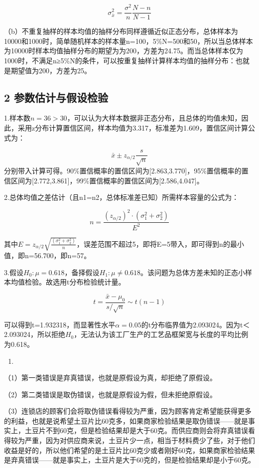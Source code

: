 \documentclass[]{ctexbook}
\begin{document}
\[\sigma_{\bar x}^2=\frac{\sigma^2}{n}\frac{N-n}{N-1}\]

（b）不重复抽样的样本均值的抽样分布同样遵循近似正态分布，总体样本为10000和1000时，简单随机样本的样本量n=100，5\%N=500和50，所以当总体样本为10000时样本均值抽样分布的期望为为200，方差为24.75。而当总体样本仅为1000时，不满足n≥5\%N的条件，可以按重复抽样计算样本均值的抽样分布：也就是期望值为200，方差为25。

\hypertarget{ux53c2ux6570ux4f30ux8ba1ux4e0eux5047ux8bbeux68c0ux9a8c-1}{%
\subsection{2 参数估计与假设检验}\label{ux53c2ux6570ux4f30ux8ba1ux4e0eux5047ux8bbeux68c0ux9a8c-1}}

1.样本数\(n=36>30\)，可以认为大样本数据非正态分布，且总体的均值未知，因此，采用z分布计算置信区间，样本均值为3.317，标准差为1.609，置信区间计算公式为：

\[\bar x\pm z_{\alpha/2}\frac{s}{\sqrt{n}}\]
分别带入计算可得。90\%置信概率的置信区间为{[}2.863,3.770{]}，95\%置信概率的置信区间为{[}2.772,3.861{]}，99\%置信概率的置信区间为{[}2.586,4.047{]}。

2.总体均值之差估计（且n1=n2，总体标准差已知）所需样本容量的公式为：

\[n=\frac{(z_{\alpha/2})^2\cdot(\sigma_1^2+\sigma_2^2)}{E^2}\]

其中\(E=z_{\alpha/2}\sqrt{\frac{(\sigma_1^2+\sigma_2^2)}{n}}\)，误差范围不超过5，即将E=5带入，即可得到n的最小值，即n=56.700，即n=57。

3.假设\(H_0: \mu=0.618\)，备择假设\(H_1: \mu≠0.618\)。该问题为总体方差未知的正态小样本均值检验。故选用t分布检验统计量。

\[t=\frac{\bar x-\mu_0}{s/\sqrt{n}}\sim t(n-1)\]

可以得到t=1.932318，而显著性水平\(\alpha=0.05\)的t分布临界值为2.093024。因为t＜2.093024，所以拒绝\(H_0\)，无法认为该工厂生产的工艺品框架宽与长度的平均比例为0.618。

\begin{enumerate}
\def\labelenumi{\arabic{enumi}.}
\setcounter{enumi}{3}
\item
\end{enumerate}

（1）第一类错误是弃真错误，也就是原假设为真，却拒绝了原假设。

（2）第二类错误是取伪错误，也就是原假设为假，但未拒绝原假设。

（3）连锁店的顾客们会将取伪错误看得较为严重，因为顾客肯定希望能获得更多的利益，也就是说希望土豆片比60克多，如果商家检验结果是取伪错误------就是事实上，土豆片不到60克，但是检验结果却是大于60克。而供应商则会将弃真错误看得较为严重，因为对供应商来说，土豆片少一点，相当于材料费少了些，对于他们收益是好的，所以他们希望的是土豆片比60克少或者刚好60克，如果商家检验结果是弃真错误------就是事实上，土豆片是大于60克的，但是检验结果却是小于60克。
\end{document}
